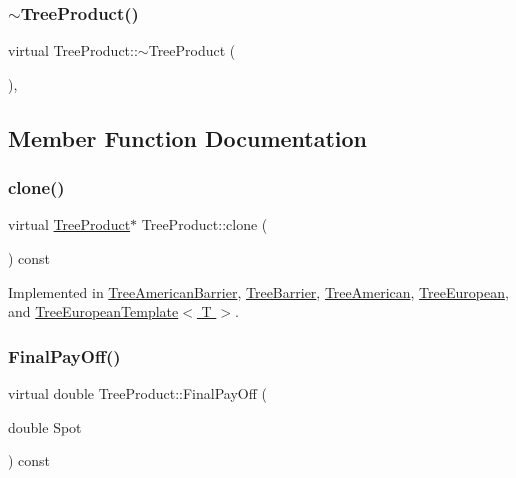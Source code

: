 \subsubsection{\texorpdfstring{$\sim$\+Tree\+Product()}{~TreeProduct()}}
{\footnotesize\ttfamily virtual Tree\+Product\+::$\sim$\+Tree\+Product (\begin{DoxyParamCaption}{ }\end{DoxyParamCaption})\hspace{0.3cm}{\ttfamily [inline]}, {\ttfamily [virtual]}}



\subsection{Member Function Documentation}
\hypertarget{classTreeProduct_a38edda2bee3c7203e94511df96a18c32}{}\label{classTreeProduct_a38edda2bee3c7203e94511df96a18c32} 
\subsubsection{\texorpdfstring{clone()}{clone()}}
{\footnotesize\ttfamily virtual \hyperlink{classTreeProduct}{Tree\+Product}$\ast$ Tree\+Product\+::clone (\begin{DoxyParamCaption}{ }\end{DoxyParamCaption}) const\hspace{0.3cm}{\ttfamily [pure virtual]}}



Implemented in \hyperlink{classTreeAmericanBarrier_a25a7d1fdcfd55228de1b4f50d0b3943d}{Tree\+American\+Barrier}, \hyperlink{classTreeBarrier_a549dec4cf147800496f9efca623201f9}{Tree\+Barrier}, \hyperlink{classTreeAmerican_ade2d404dec9ebd28695f246393dd0256}{Tree\+American}, \hyperlink{classTreeEuropean_acf540b1c3082da0853905f252bf9d773}{Tree\+European}, and \hyperlink{classTreeEuropeanTemplate_ab295adeefbb84f93854f07f511742ae7}{Tree\+European\+Template$<$ T $>$}.

\hypertarget{classTreeProduct_acda7abc61cf6ac1b0f69a09eb0709832}{}\label{classTreeProduct_acda7abc61cf6ac1b0f69a09eb0709832} 
\subsubsection{\texorpdfstring{Final\+Pay\+Off()}{FinalPayOff()}}
{\footnotesize\ttfamily virtual double Tree\+Product\+::\+Final\+Pay\+Off (\begin{DoxyParamCaption}\item[{double}]{Spot }\end{DoxyParamCaption}) const\hspace{0.3cm}{\ttfamily [pure virtual]}}



